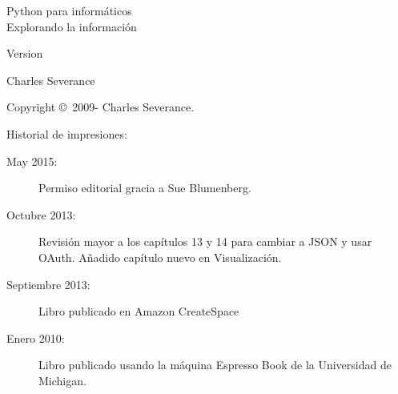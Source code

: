 



\newtheorem{ex}{Ejercicio}[chapter]

\begin{latexonly}

\renewcommand{\blankpage}{\thispagestyle{empty} \quad \newpage}

\thispagestyle{empty}

\begin{flushright}
\vspace*{2.0in}

\begin{spacing}{3}
{\huge Python para informáticos}\\
{\Large Explorando la información}
\end{spacing}

\vspace{0.25in}

Version \theversion

\vspace{0.5in}


{\Large
Charles Severance\\
}

\vfill

\end{flushright}

\pagebreak
\thispagestyle{empty}

{\small
Copyright \copyright ~2009- Charles Severance.


Historial de impresiones:

\begin{description}

\item[May 2015:] Permiso editorial gracia a Sue Blumenberg.

\item[Octubre 2013:] Revisión mayor a los capítulos 13 y 14
para cambiar a JSON y usar OAuth.
Añadido capítulo nuevo en Visualización.

\item[Septiembre 2013:] Libro publicado en Amazon CreateSpace

\item[Enero 2010:] Libro publicado usando la máquina
Espresso Book de la Universidad de Michigan.


\end{description}}
\end{latexonly}
